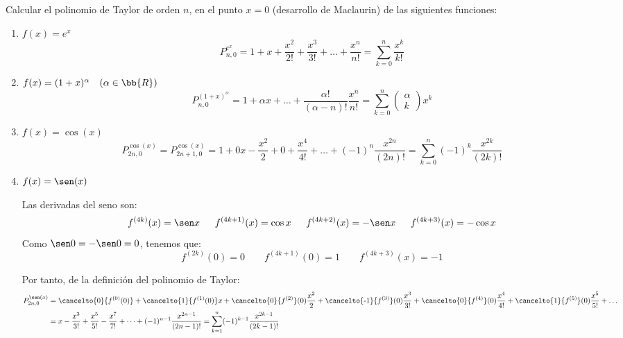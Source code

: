 \begin{ejercicio}
    Calcular el polinomio de Taylor de orden $n$, en el punto $x=0$ (desarrollo de Maclaurin) de las siguientes funciones:
    \begin{enumerate}
        \item $f(x) = e^x$
        \begin{equation*}
            P_{n, 0}^{e^x} = 1 + x + \frac{x^2}{2!} + \frac{x^3}{3!} + \dots + \frac{x^n}{n!} = \sum_{k=0}^n \frac{x^k}{k!}
        \end{equation*}

        \item $f(x) = (1+x)^\alpha \quad (\alpha \in \bb{R})$
        \begin{equation*}
            P_{n, 0}^{(1+x)^\alpha} = 1 + \alpha x + \dots + \frac{\alpha!}{(\alpha-n)!} \frac{x^n}{n!} = \sum_{k=0}^n \left(\begin{array}{c}
                \alpha \\ k \end{array} \right) x^k
        \end{equation*}

        \item $f(x) = \cos(x)$
        \begin{equation*}
            P_{2n, 0}^{\cos(x)} = P_{2n+1, 0}^{\cos(x)} = 1 + 0x -\frac{x^2}{2} + 0 + \frac{x^4}{4!} + \dots + (-1)^n \frac{x^{2n}}{(2n)!}
            = \sum_{k=0}^n (-1)^k \frac{x^{2k}}{(2k)!}
        \end{equation*}

        \item $f(x) = \sen(x)$
        
        Las derivadas del seno son:
        \begin{equation*}
            f^{(4k)}(x) = \sen x
            \quad\;\;
            f^{(4k+1)}(x) = \cos x
            \quad\;\;
            f^{(4k+2)}(x) = -\sen x
            \quad\;\;
            f^{(4k+3)}(x) = -\cos x
        \end{equation*}
        Como $\sen 0 = -\sen 0 = 0$, tenemos que:
        \begin{equation*}
            f^{(2k)}(0) = 0
            \qquad
            f^{(4k+1)}(0) = 1
            \qquad
            f^{(4k+3)}(x) = -1
        \end{equation*}

        Por tanto, de la definición del polinomio de Taylor:        
        \begin{equation*}\begin{split}
            P_{2n, 0}^{\sen(x)} &= \cancelto{0}{f^{(0)}(0)} + \cancelto{1}{ f^{(1)}(0)}x + \cancelto{0}{f^{(2)}}(0)\frac{x^2}{2} + \cancelto{\text{-}1}{f^{(3)}}(0)\frac{x^3}{3!} + \cancelto{0}{f^{(4)}}(0)\frac{x^4}{4!} + \cancelto{1}{f^{(5)}}(0)\frac{x^5}{5!} + \dots \\
            &= x -\frac{x^3}{3!} + \frac{x^5}{5!} - \frac{x^7}{7!}+ \dots + (-1)^{n-1} \frac{x^{2n-1}}{(2n-1)!}
            = \sum_{k=1}^n (-1)^{k-1} \frac{x^{2k-1}}{(2k-1)!}
        \end{split}\end{equation*}


\end{enumerate}
\end{ejercicio}
